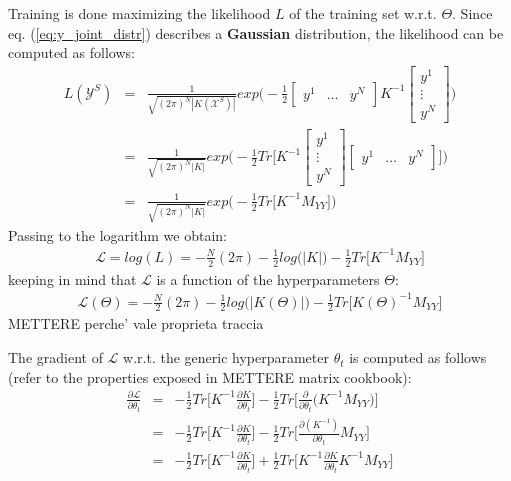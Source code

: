 \documentclass{article}
\begin{document}
Training is done maximizing the likelihood $L$ of the training set w.r.t. $\Theta$.
Since eq. (\ref{eq:y_joint_distr}) describes a \textbf{Gaussian} distribution, the likelihood can be computed as follows:
\begin{eqnarray}
L(\mathcal{Y}^S) &=& 
\frac{1}{\sqrt{(2 \pi)^N \left | K(\mathcal{X}^S) \right | }}
exp \bigg ( - \frac{1}{2}
\begin{bmatrix} y^1 & \hdots & y^N \end{bmatrix} 
K^{-1}
\begin{bmatrix} y^1 \\ \vdots \\ y^N \end{bmatrix} 
\bigg ) \\
&=& 
\frac{1}{\sqrt{(2 \pi)^N \left | K \right | }}
exp \bigg ( - \frac{1}{2}
Tr \bigg [ 
K^{-1}
\begin{bmatrix} y^1 \\ \vdots \\ y^N \end{bmatrix} 
\begin{bmatrix} y^1 & \hdots & y^N \end{bmatrix} 
\bigg ]
\bigg ) \\
&=&
\frac{1}{\sqrt{(2 \pi)^N \left | K \right | }}
exp \bigg ( - \frac{1}{2}
Tr \bigg [ 
K^{-1}
M_{YY}
\bigg ]
\bigg )
\end{eqnarray}
Passing to the logarithm we obtain:
\begin{eqnarray}
\mathcal{L} = log(L) = 
-\frac{N}{2}(2 \pi) 
-\frac{1}{2} log \big (\left | K \right | \big )
-\frac{1}{2} Tr \bigg [
K^{-1} M_{YY}
\bigg ] 
\end{eqnarray}
keeping in mind that $\mathcal{L}$ is a function of the hyperparameters $\Theta$:
\begin{eqnarray}
\mathcal{L}(\Theta) = 
-\frac{N}{2}(2 \pi) 
-\frac{1}{2} log \big (\left | K(\Theta) \right | \big )
-\frac{1}{2} Tr \bigg [
K(\Theta)^{-1} M_{YY}
\bigg ] 
\end{eqnarray}
METTERE perche' vale proprieta traccia

The gradient of $\mathcal{L}$ w.r.t. the generic hyperparameter $\theta_t$ is computed as follows (refer to the properties exposed in METTERE matrix cookbook):
\begin{eqnarray}
\frac{\partial \mathcal{L}}{\partial \theta_t} &=& 
-\frac{1}{2} Tr \bigg [ K^{-1} \frac{\partial K}{\partial \theta_t} \bigg ]
-\frac{1}{2} Tr \bigg [ \frac{\partial }{\partial \theta_t} \big (  
K^{-1} M_{YY}
\big ) \bigg ] \\
&=& -\frac{1}{2} Tr \bigg [ K^{-1} \frac{\partial K}{\partial \theta_t} \bigg ]
-\frac{1}{2} Tr \bigg [ \frac{\partial (K^{-1}) }{\partial \theta_t} M_{YY} \bigg ] \\
&=& -\frac{1}{2} Tr \bigg [ K^{-1} \frac{\partial K}{\partial \theta_t} \bigg ]
+\frac{1}{2} Tr \bigg [ K^{-1} \frac{\partial K}{\partial \theta_t} K^{-1} M_{YY} \bigg ]
 \label{eq:L_grad}
\end{eqnarray}
\end{document}
